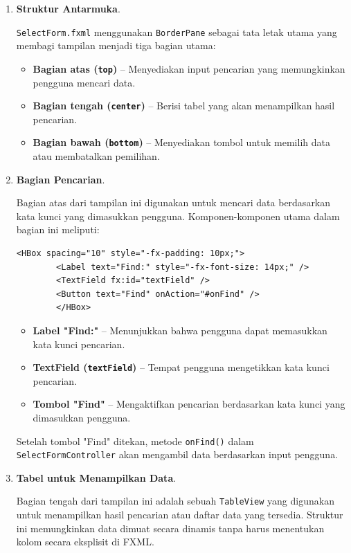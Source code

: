 \begin{enumerate}
	\item \textbf{Struktur Antarmuka}.
	
	\texttt{SelectForm.fxml} menggunakan \texttt{BorderPane} sebagai tata letak utama yang membagi tampilan menjadi tiga bagian utama:
	
	\begin{itemize}
		\item \textbf{Bagian atas (\texttt{top})} – Menyediakan input pencarian yang memungkinkan pengguna mencari data.
		\item \textbf{Bagian tengah (\texttt{center})} – Berisi tabel yang akan menampilkan hasil pencarian.
		\item \textbf{Bagian bawah (\texttt{bottom})} – Menyediakan tombol untuk memilih data atau membatalkan pemilihan.
	\end{itemize}
	
	\item \textbf{Bagian Pencarian}.
	
	Bagian atas dari tampilan ini digunakan untuk mencari data berdasarkan kata kunci yang dimasukkan pengguna. Komponen-komponen utama dalam bagian ini meliputi:
	
	\begin{lstlisting}[style=XmlStyle]
		<HBox spacing="10" style="-fx-padding: 10px;">
		<Label text="Find:" style="-fx-font-size: 14px;" />
		<TextField fx:id="textField" />
		<Button text="Find" onAction="#onFind" />
		</HBox>
	\end{lstlisting}
	
	\begin{itemize}
		\item \textbf{Label "Find:"} – Menunjukkan bahwa pengguna dapat memasukkan kata kunci pencarian.
		\item \textbf{TextField (\texttt{textField})} – Tempat pengguna mengetikkan kata kunci pencarian.
		\item \textbf{Tombol "Find"} – Mengaktifkan pencarian berdasarkan kata kunci yang dimasukkan pengguna.
	\end{itemize}
	
	Setelah tombol "Find" ditekan, metode \texttt{onFind()} dalam \texttt{SelectFormController} akan mengambil data berdasarkan input pengguna.
	
	\item \textbf{Tabel untuk Menampilkan Data}.
	
	Bagian tengah dari tampilan ini adalah sebuah \texttt{TableView} yang digunakan untuk menampilkan hasil pencarian atau daftar data yang tersedia. Struktur ini memungkinkan data dimuat secara dinamis tanpa harus menentukan kolom secara eksplisit di FXML.
	

\end{enumerate}
